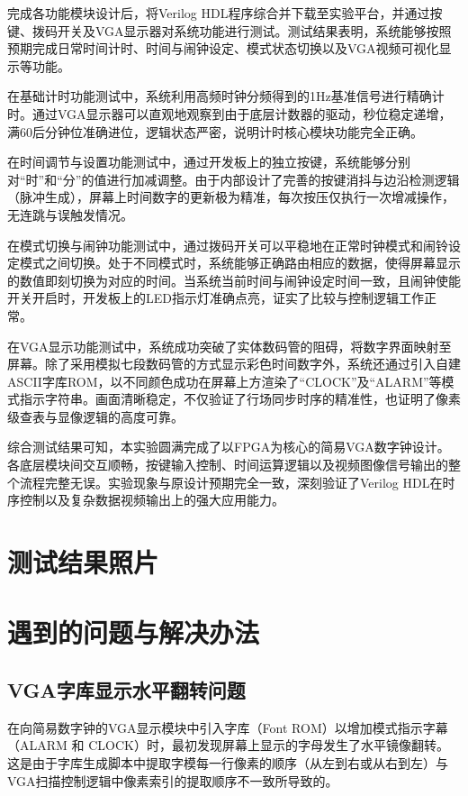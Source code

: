 \documentclass[11pt,a4paper]{article}
\begin{document}
完成各功能模块设计后，将Verilog HDL程序综合并下载至实验平台，并通过按键、拨码开关及VGA显示器对系统功能进行测试。测试结果表明，系统能够按照预期完成日常时间计时、时间与闹钟设定、模式状态切换以及VGA视频可视化显示等功能。

在基础计时功能测试中，系统利用高频时钟分频得到的1Hz基准信号进行精确计时。通过VGA显示器可以直观地观察到由于底层计数器的驱动，秒位稳定递增，满60后分钟位准确进位，逻辑状态严密，说明计时核心模块功能完全正确。

在时间调节与设置功能测试中，通过开发板上的独立按键，系统能够分别对“时”和“分”的值进行加减调整。由于内部设计了完善的按键消抖与边沿检测逻辑（脉冲生成），屏幕上时间数字的更新极为精准，每次按压仅执行一次增减操作，无连跳与误触发情况。

在模式切换与闹钟功能测试中，通过拨码开关可以平稳地在正常时钟模式和闹铃设定模式之间切换。处于不同模式时，系统能够正确路由相应的数据，使得屏幕显示的数值即刻切换为对应的时间。当系统当前时间与闹钟设定时间一致，且闹钟使能开关开启时，开发板上的LED指示灯准确点亮，证实了比较与控制逻辑工作正常。

在VGA显示功能测试中，系统成功突破了实体数码管的阻碍，将数字界面映射至屏幕。除了采用模拟七段数码管的方式显示彩色时间数字外，系统还通过引入自建ASCII字库ROM，以不同颜色成功在屏幕上方渲染了“CLOCK”及“ALARM”等模式指示字符串。画面清晰稳定，不仅验证了行场同步时序的精准性，也证明了像素级查表与显像逻辑的高度可靠。

综合测试结果可知，本实验圆满完成了以FPGA为核心的简易VGA数字钟设计。各底层模块间交互顺畅，按键输入控制、时间运算逻辑以及视频图像信号输出的整个流程完整无误。实验现象与原设计预期完全一致，深刻验证了Verilog HDL在时序控制以及复杂数据视频输出上的强大应用能力。

\section{测试结果照片}


\section{遇到的问题与解决办法}

\subsection{VGA字库显示水平翻转问题}

在向简易数字钟的VGA显示模块中引入字库（Font ROM）以增加模式指示字幕（ALARM 和 CLOCK）时，最初发现屏幕上显示的字母发生了水平镜像翻转。这是由于字库生成脚本中提取字模每一行像素的顺序（从左到右或从右到左）与VGA扫描控制逻辑中像素索引的提取顺序不一致所导致的。
\end{document}
